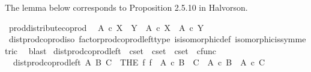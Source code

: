 \begin{isabellebody}
{\isafoldproof}%
%
\isadelimproof
%
\endisadelimproof
%
\begin{isamarkuptext}%
The lemma below corresponds to Proposition 2.5.10 in Halvorson.%
\end{isamarkuptext}\isamarkuptrue%
\isamarkupfalse%
\ prod{\isacharunderscore}{\kern0pt}distribute{\isacharunderscore}{\kern0pt}coprod{\isacharcolon}{\kern0pt}\isanewline
\ \ {\isachardoublequoteopen}A\ {\isasymtimes}\isactrlsub c\ {\isacharparenleft}{\kern0pt}X\ {\isasymCoprod}\ Y{\isacharparenright}{\kern0pt}\ {\isasymcong}\ {\isacharparenleft}{\kern0pt}A\ {\isasymtimes}\isactrlsub c\ X{\isacharparenright}{\kern0pt}\ {\isasymCoprod}\ {\isacharparenleft}{\kern0pt}A\ {\isasymtimes}\isactrlsub c\ Y{\isacharparenright}{\kern0pt}{\isachardoublequoteclose}\isanewline
%
\isadelimproof
\ \ %
\endisadelimproof
%
\isatagproof
{}\isamarkupfalse%
\ dist{\isacharunderscore}{\kern0pt}prod{\isacharunderscore}{\kern0pt}coprod{\isacharunderscore}{\kern0pt}iso\ factor{\isacharunderscore}{\kern0pt}prod{\isacharunderscore}{\kern0pt}coprod{\isacharunderscore}{\kern0pt}left{\isacharunderscore}{\kern0pt}type\ is{\isacharunderscore}{\kern0pt}isomorphic{\isacharunderscore}{\kern0pt}def\ isomorphic{\isacharunderscore}{\kern0pt}is{\isacharunderscore}{\kern0pt}symmetric\ \isamarkupfalse%
\ blast%
\endisatagproof
{\isafoldproof}%
%
\isadelimproof
%
\endisadelimproof
%
\isadelimdocument
%
\endisadelimdocument
%
\isatagdocument
%
\isamarkuptrue%
%
\endisatagdocument
{\isafolddocument}%
%
\isadelimdocument
%
\endisadelimdocument
{}\isamarkupfalse%
\ dist{\isacharunderscore}{\kern0pt}prod{\isacharunderscore}{\kern0pt}coprod{\isacharunderscore}{\kern0pt}left\ {\isacharcolon}{\kern0pt}{\isacharcolon}{\kern0pt}\ {\isachardoublequoteopen}cset\ {\isasymRightarrow}\ cset\ {\isasymRightarrow}\ cset\ {\isasymRightarrow}\ cfunc{\isachardoublequoteclose}\ \isanewline
\ \ {\isachardoublequoteopen}dist{\isacharunderscore}{\kern0pt}prod{\isacharunderscore}{\kern0pt}coprod{\isacharunderscore}{\kern0pt}left\ A\ B\ C\ {\isacharequal}{\kern0pt}\ {\isacharparenleft}{\kern0pt}THE\ f{\isachardot}{\kern0pt}\ f\ {\isacharcolon}{\kern0pt}\ A\ {\isasymtimes}\isactrlsub c\ {\isacharparenleft}{\kern0pt}B\ {\isasymCoprod}\ C{\isacharparenright}{\kern0pt}\ {\isasymrightarrow}\ {\isacharparenleft}{\kern0pt}A\ {\isasymtimes}\isactrlsub c\ B{\isacharparenright}{\kern0pt}\ {\isasymCoprod}\ {\isacharparenleft}{\kern0pt}A\ {\isasymtimes}\isactrlsub c\ C{\isacharparenright}{\kern0pt}\isanewline

\end{isabellebody}
